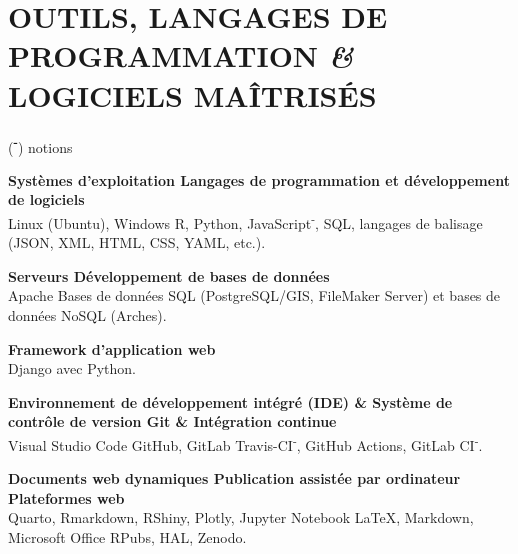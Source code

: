 \documentclass{article}
\newcommand{\fr}[1]{#1}       %
\newcommand{\en}[1]{}     %
\begin{document}
\section*{\fr{OUTILS, LANGAGES DE PROGRAMMATION \textit{\&} LOGICIELS MAÎTRISÉS}\en{TOOLS, PROGRAMMING LANGUAGES \textit{\&} SOFTWARE PROFICIENCY}}
\begin{center}(\textbf{\textsuperscript{-}}) \fr{notions}\en{basic knowledge}\end{center}
\smallbreak
\textbf{\fr{Systèmes d'exploitation {\textbar} Langages de programmation et développement de logiciels}\en{Operating Systems {\textbar} Programming Languages and Software Development}} \\
\fr{Linux (Ubuntu), Windows \textbf{{\textbar}} \textsf{R}, \textsf{Python}, \textsf{JavaScript\textsuperscript{-}}, SQL, langages de balisage (JSON, XML, HTML, CSS, YAML, etc.).}
\en{Linux (Ubuntu), Windows \textbf{{\textbar}} \textsf{R}, \textsf{Python}, \textsf{JavaScript\textsuperscript{-}}, SQL, Markup Languages (JSON, XML, HTML, CSS, YAML, etc.).}
\smallbreak
\textbf{\fr{Serveurs {\textbar} Développement de bases de données}\en{Servers {\textbar} Database Development}} \\
\fr{Apache \textbf{{\textbar}} Bases de données SQL (PostgreSQL/GIS, FileMaker Server) et bases de données NoSQL (Arches).}
\en{Apache \textbf{{\textbar}} SQL Databases (PostgreSQL/GIS, FileMaker Server) and NoSQL Databases (Arches).}
\smallbreak
\textbf{\fr{Framework d'application web}\en{Web Application Framework}} \\
\fr{\textsf{Django} avec \textsf{Python}.}
\en{\textsf{Django} with \textsf{Python}.}
\smallbreak
\textbf{\fr{Environnement de développement intégré (IDE) \& Système de contrôle de version Git \& Intégration continue}\en{Integrated Development Environment (IDE) \& Version Control System Git \& Continuous Integration}} \\
\fr{Visual Studio Code \textbf{{\textbar}} GitHub, GitLab \textbf{{\textbar}} Travis-CI\textsuperscript{-}, GitHub Actions, GitLab CI\textsuperscript{-}.}
\en{Visual Studio Code \textbf{{\textbar}} GitHub, GitLab \textbf{{\textbar}} Travis-CI\textsuperscript{-}, GitHub Actions, GitLab CI\textsuperscript{-}.}
\smallbreak
\textbf{\fr{Documents web dynamiques {\textbar} Publication assistée par ordinateur {\textbar} Plateformes web}\en{Dynamic Web Documents {\textbar} Computer-Assisted Publishing {\textbar} Web Platforms}} \\
\fr{\textsf{Quarto}, \textsf{Rmarkdown}, \textsf{RShiny}, \textsf{Plotly}, \textsf{Jupyter Notebook} \textbf{{\textbar}} \LaTeX, \textsf{Markdown}, Microsoft Office \textbf{{\textbar}} RPubs, HAL, Zenodo.}
\end{document}
